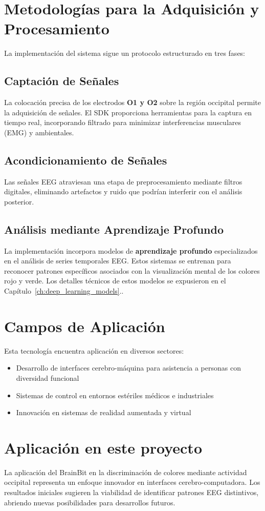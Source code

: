\newpage

\section{Metodologías para la Adquisición y Procesamiento}
La implementación del sistema sigue un protocolo estructurado en tres fases:

    \subsection{Captación de Señales}
    La colocación precisa de los electrodos \textbf{O1 y O2} sobre la región occipital permite la adquisición de señales. El SDK proporciona herramientas para la captura en tiempo real, incorporando filtrado para minimizar interferencias musculares (EMG) y ambientales.

    \subsection{Acondicionamiento de Señales}
    Las señales EEG atraviesan una etapa de preprocesamiento mediante filtros digitales, eliminando artefactos y ruido que podrían interferir con el análisis posterior.

    \subsection{Análisis mediante Aprendizaje Profundo}
    La implementación incorpora modelos de \textbf{aprendizaje profundo} especializados en el análisis de series temporales EEG. Estos sistemas se entrenan para reconocer patrones específicos asociados con la visualización mental de los colores rojo y verde. Los detalles técnicos de estos modelos se expusieron en el Capítulo~\ref{ch:deep_learning_models}..

\section{Campos de Aplicación}
Esta tecnología encuentra aplicación en diversos sectores:

    \begin{itemize}
        \item Desarrollo de interfaces cerebro-máquina para asistencia a personas con diversidad funcional
        \item Sistemas de control en entornos estériles médicos e industriales
        \item Innovación en sistemas de realidad aumentada y virtual
    \end{itemize}

\section{Aplicación en este proyecto}
La aplicación del BrainBit en la discriminación de colores mediante actividad occipital representa un enfoque innovador en interfaces cerebro-computadora. Los resultados iniciales sugieren la viabilidad de identificar patrones EEG distintivos, abriendo nuevas posibilidades para desarrollos futuros.

